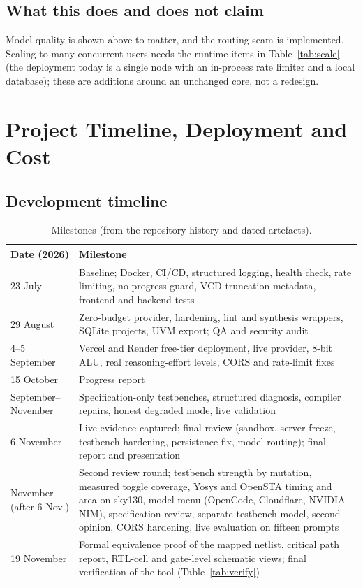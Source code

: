 \subsection{What this does and does not claim}
Model quality is shown above to matter, and the routing seam is implemented. Scaling to many concurrent users needs the runtime items in Table~\ref{tab:scale} (the deployment today is a single node with an in-process rate limiter and a local database); these are additions around an unchanged core, not a redesign.

\section{Project Timeline, Deployment and Cost}
\label{sec:project}

\subsection{Development timeline}
\begin{table}[H]
\centering
\caption{Milestones (from the repository history and dated artefacts).}
\label{tab:timeline}
\footnotesize
\begin{tabularx}{\textwidth}{@{}p{2.6cm}X@{}}
\toprule
\textbf{Date (2026)} & \textbf{Milestone} \\
\midrule
23 July & Baseline; Docker, CI/CD, structured logging, health check, rate limiting, no-progress guard, VCD truncation metadata, frontend and backend tests \\
29 August & Zero-budget provider, hardening, lint and synthesis wrappers, SQLite projects, UVM export; QA and security audit \\
4--5 September & Vercel and Render free-tier deployment, live provider, 8-bit ALU, real reasoning-effort levels, CORS and rate-limit fixes \\
15 October & Progress report \\
September--November & Specification-only testbenches, structured diagnosis, compiler repairs, honest degraded mode, live validation \\
6 November & Live evidence captured; final review (sandbox, server freeze, testbench hardening, persistence fix, model routing); final report and presentation \\
November (after 6 Nov.) & Second review round; testbench strength by mutation, measured toggle coverage, Yosys and OpenSTA timing and area on sky130, model menu (OpenCode, Cloudflare, NVIDIA NIM), specification review, separate testbench model, second opinion, CORS hardening, live evaluation on fifteen prompts \\
19 November & Formal equivalence proof of the mapped netlist, critical path report, RTL-cell and gate-level schematic views; final verification of the tool (Table~\ref{tab:verify}) \\
\bottomrule
\end{tabularx}
\end{table}

